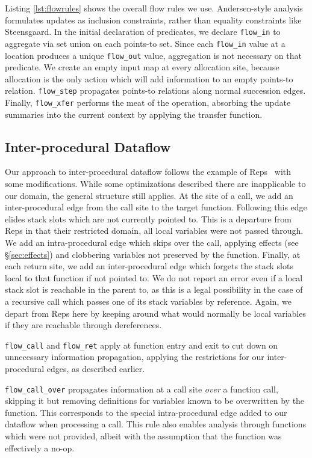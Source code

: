 Listing \ref{lst:flowrules} shows the overall flow rules we use.
Andersen-style analysis formulates updates as inclusion constraints, rather than equality constraints like Steensgaard.
In the initial declaration of predicates, we declare \texttt{flow\_in} to aggregate via set union on each points-to set.
Since each \texttt{flow\_in} value at a location produces a unique \texttt{flow\_out} value, aggregation is not necessary on that predicate.
We create an empty input map at every allocation site, because allocation is the only action which will add information to an empty points-to relation.
\texttt{flow\_step} propagates points-to relations along normal succession edges.
Finally, \texttt{flow\_xfer} performs the meat of the operation, absorbing the update summaries into the current context by applying the transfer function.

\subsection{Inter-procedural Dataflow}
\label{sec:interproc}
Our approach to inter-procedural dataflow follows the example of Reps~\cite{interproc-dataflow} with some modifications.
While some optimizations described there are inapplicable to our domain, the general structure still applies.
At the site of a call, we add an inter-procedural edge from the call site to the target function.
Following this edge elides stack slots which are not currently pointed to.
This is a departure from Reps in that their restricted domain, all local variables were not passed through.
We add an intra-procedural edge which skips over the call, applying effects (see \S \ref{sec:effects}) and clobbering variables not preserved by the function.
Finally, at each return site, we add an inter-procedural edge which forgets the stack slots local to that function if not pointed to.
We do not report an error even if a local stack slot is reachable in the parent to, as this is a legal possibility in the case of a recursive call which passes one of its stack variables by reference.
Again, we depart from Reps here by keeping around what would normally be local variables if they are reachable through dereferences.

\texttt{flow\_call} and \texttt{flow\_ret} apply at function entry and exit to cut down on unnecessary information propagation, applying the restrictions for our inter-procedural edges, as described earlier.

\texttt{flow\_call\_over} propagates information at a call site \emph{over} a function call, skipping it but removing definitions for variables known to be overwritten by the function.
This corresponds to the special intra-procedural edge added to our dataflow when processing a call.
This rule also enables analysis through functions which were not provided, albeit with the assumption that the function was effectively a no-op.

